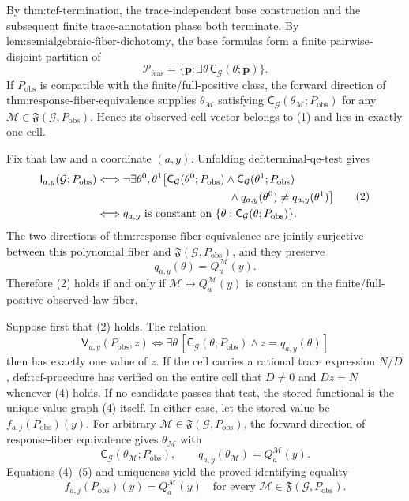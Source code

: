 By \(\text{thm:tcf-termination}\), the trace-independent base construction and the subsequent finite trace-annotation phase both terminate. By \(\text{lem:semialgebraic-fiber-dichotomy}\), the base formulas form a finite pairwise-disjoint partition of
\[
\mathcal P_{\mathrm{feas}}
=\{\mathbf p:\exists\theta\,\mathsf C_{\mathcal G}(\theta;\mathbf p)\}.
\tag{1}
\]
If \(P_{\mathrm{obs}}\) is compatible with the finite/full-positive class, the forward direction of \(\text{thm:response-fiber-equivalence}\) supplies \(\theta_{\mathcal M}\) satisfying \(\mathsf C_{\mathcal G}(\theta_{\mathcal M};P_{\mathrm{obs}})\) for any \(\mathcal M\in\mathfrak F(\mathcal G,P_{\mathrm{obs}})\). Hence its observed-cell vector belongs to (1) and lies in exactly one cell.

Fix that law and a coordinate \((a,y)\). Unfolding \(\text{def:terminal-qe-test}\) gives
\[
\begin{aligned}
\mathsf I_{a,y}(\mathcal G;P_{\mathrm{obs}})
&\Longleftrightarrow
\neg\exists\theta^0,\theta^1\bigl[
\mathsf C_{\mathcal G}(\theta^0;P_{\mathrm{obs}})
\wedge\mathsf C_{\mathcal G}(\theta^1;P_{\mathrm{obs}})\\
&\hspace{42mm}\wedge q_{a,y}(\theta^0)\neq q_{a,y}(\theta^1)
\bigr]\\
&\Longleftrightarrow q_{a,y}\text{ is constant on }
\{\theta:\mathsf C_{\mathcal G}(\theta;P_{\mathrm{obs}})\}.
\end{aligned}
\tag{2}
\]
The two directions of \(\text{thm:response-fiber-equivalence}\) are jointly surjective between this polynomial fiber and \(\mathfrak F(\mathcal G,P_{\mathrm{obs}})\), and they preserve
\[
q_{a,y}(\theta)=Q_a^{\mathcal M}(y).
\tag{3}
\]
Therefore (2) holds if and only if \(\mathcal M\mapsto Q_a^{\mathcal M}(y)\) is constant on the finite/full-positive observed-law fiber.

Suppose first that (2) holds. The relation
\[
\mathsf V_{a,y}(P_{\mathrm{obs}},z)
\Longleftrightarrow
\exists\theta\,[\mathsf C_{\mathcal G}(\theta;P_{\mathrm{obs}})\wedge z=q_{a,y}(\theta)]
\tag{4}
\]
then has exactly one value of \(z\). If the cell carries a rational trace expression \(N/D\), \(\text{def:tcf-procedure}\) has verified on the entire cell that \(D\neq0\) and \(Dz=N\) whenever (4) holds. If no candidate passes that test, the stored functional is the unique-value graph (4) itself. In either case, let the stored value be \(f_{a,j}(P_{\mathrm{obs}})(y)\). For arbitrary \(\mathcal M\in\mathfrak F(\mathcal G,P_{\mathrm{obs}})\), the forward direction of response-fiber equivalence gives \(\theta_{\mathcal M}\) with
\[
\mathsf C_{\mathcal G}(\theta_{\mathcal M};P_{\mathrm{obs}}),
\qquad
q_{a,y}(\theta_{\mathcal M})=Q_a^{\mathcal M}(y).
\tag{5}
\]
Equations (4)--(5) and uniqueness yield the proved identifying equality
\[
f_{a,j}(P_{\mathrm{obs}})(y)=Q_a^{\mathcal M}(y)
\quad\text{for every }\mathcal M\in\mathfrak F(\mathcal G,P_{\mathrm{obs}}).
\tag{6}
\]

